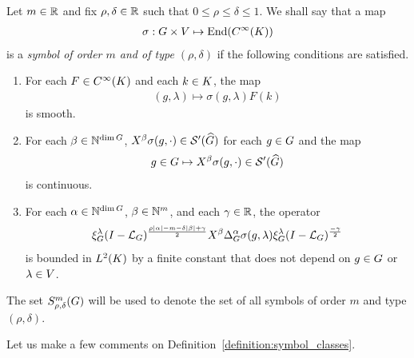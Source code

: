 \begin{definition}
\label{definition:symbol_classes}
    Let $m \in \mathbb{R}$ and fix $\rho, \delta \in \mathbb{R}$ such that $0 \leq \rho \leq \delta \leq 1$.
    We shall say that a map
    \begin{align*}
        \sigma : G \times V \mapsto \operatorname{End}({C^\infty(K)})
    \end{align*}
    is a \emph{symbol of order $m$ and of type $(\rho, \delta)$} if the following conditions are satisfied.
    \begin{enumerate}
        \item
            For each $F \in {C^\infty(K)}$ and each $k \in K$,
            the map
            \begin{align*}
                (g, \lambda) \mapsto \sigma(g, \lambda) F(k)
            \end{align*}
            is smooth.
        \item
            For each $\beta \in \mathbb{N}^{\dim G}$,
            $\LeftDifferentialOperator \beta \sigma(g, \dummy) \in \TemperedDistributions {\dualGroup \Group}$
            for each $g \in G$ and the map
            \begin{align*}
                g \in \Group \mapsto \LeftDifferentialOperator \beta \sigma(g, \dummy) \in \TemperedDistributions {\dualGroup \Group}
            \end{align*}
            is continuous.
        \item \label{item:symbol_bound_condition}
            For each $\alpha \in \mathbb{N}^{\dim G}$, $\beta \in \mathbb{N}^m$, and each $\gamma \in \mathbb{R}$,
            the operator
            \begin{align*}
                \Rep{\lambda} \BesselPotential{\rho \abs\alpha - m - \delta \abs\beta + \gamma} \LeftDifferentialOperator{\beta} \DifferenceOperatorOrder{\alpha} \sigma(g, \lambda) \Rep{\lambda} \BesselPotential{-\gamma}
            \end{align*}
            is bounded in ${L^{2} (K)}$ by a finite constant that does not depend on $g \in G$ or $\lambda \in V$.
    \end{enumerate}

    The set $S^{m}_{\rho, \delta}(G)$ will be used to denote the set of all symbols of order $m$ and type $(\rho, \delta)$.
\end{definition}

Let us make a few comments on Definition~\ref{definition:symbol_classes}.

